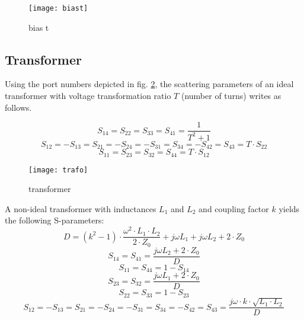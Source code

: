 \begin{figure}[ht]
\begin{center}
\texttt{[image: biast]}
\end{center}
\caption{bias t}
\label{fig:biast}
\end{figure}
\FloatBarrier

\subsection{Transformer}

Using the port numbers depicted in fig. \ref{fig:trafo}, the
scattering parameters of an ideal transformer with voltage
transformation ratio $T$ (number of turns) writes as follows.

\begin{equation}
S_{14} = S_{22} = S_{33} = S_{41} = \frac{1}{T^2+1}
\end{equation}
\begin{equation}
S_{12} = -S_{13} = S_{21} = -S_{24} = -S_{31} = S_{34} = -S_{42} = S_{43} = T\cdot S_{22}
\end{equation}
\begin{equation}
S_{11} = S_{23} = S_{32} = S_{44} = T\cdot S_{12}
\end{equation}

\begin{figure}[ht]
\begin{center}
\texttt{[image: trafo]}
\end{center}
\caption{transformer}
\label{fig:trafo}
\end{figure}
\FloatBarrier

A non-ideal transformer with inductances $L_1$ and $L_2$ and
coupling factor $k$ yields the following S-parameters:
\begin{equation}
D = (k^2 - 1) \cdot \dfrac{\omega^2\cdot L_1\cdot L_2}{2\cdot Z_0} +
    j\omega L_1 + j\omega L_2 + 2\cdot Z_0
\end{equation}
\begin{equation}
S_{14} = S_{41} = \frac{j\omega L_2 + 2\cdot Z_0}{D}
\end{equation}
\begin{equation}
S_{11} = S_{44} = 1 - S_{14}
\end{equation}
\begin{equation}
S_{23} = S_{32} = \frac{j\omega L_1 + 2\cdot Z_0}{D}
\end{equation}
\begin{equation}
S_{22} = S_{33} = 1 - S_{23}
\end{equation}
\begin{equation}
S_{12} = -S_{13} = S_{21} = -S_{24} = -S_{31} = S_{34} = -S_{42} = S_{43} =
         \dfrac{j\omega\cdot k \cdot\sqrt{L_1\cdot L_2}}{D}
\end{equation}



